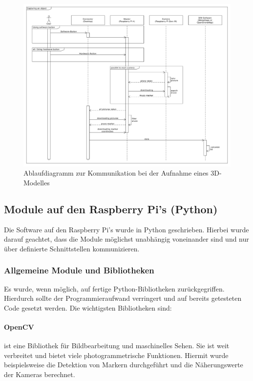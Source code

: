 \documentclass[./00PhotoBox.tex]{subfiles}
\begin{document}
\begin{figure}
    \centering
    \includegraphics[width=1\textwidth]{./img/uml/uml_sequence_capture.pdf}
    \caption{Ablaufdiagramm zur Kommunikation bei der Aufnahme eines 3D-Modelles} %
    \label{img:uml_sequence_capture} %
\end{figure}


\subsection{Module auf den Raspberry Pi's (Python)}
Die Software auf den Raspberry Pi's wurde in Python geschrieben. Hierbei wurde darauf geachtet, dass die Module möglichst unabhängig voneinander sind und nur über definierte Schnittstellen kommunizieren.

\subsubsection{Allgemeine Module und Bibliotheken}
Es wurde, wenn möglich, auf fertige Python-Bibliotheken zurückgegriffen. Hierdurch sollte der Programmieraufwand verringert und auf bereits getesteten Code gesetzt werden. Die wichtigsten Bibliotheken sind:

\paragraph{OpenCV}
ist eine Bibliothek für Bildbearbeitung und maschinelles Sehen. Sie ist weit verbreitet und bietet viele photogrammetrische Funktionen. Hiermit wurde beispielsweise die Detektion von Markern durchgeführt und die Näherungswerte der Kameras berechnet.
\end{document}
